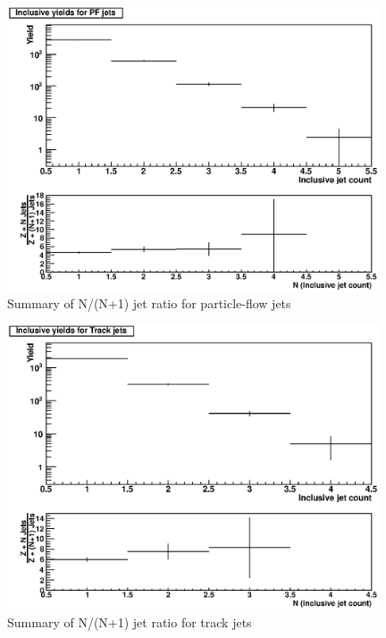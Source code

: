 \documentclass{cmspaper}
\begin{document}
\begin{figure}[hbtp]
   \begin{center}
   \includegraphics[width=110mm]{FinalPlot_FloatAll_PF}
   \caption{Summary of N/(N+1) jet ratio for particle-flow jets}
   \label{Figure_RatioFromDataPFJet}
   \end{center}
\end{figure}

\begin{figure}[hbtp]
   \begin{center}
   \includegraphics[width=110mm]{FinalPlot_FloatAll_Track}
   \caption{Summary of N/(N+1) jet ratio for track jets}
   \label{Figure_RatioFromDataTrackJet}
   \end{center}
\end{figure}
\end{document}
